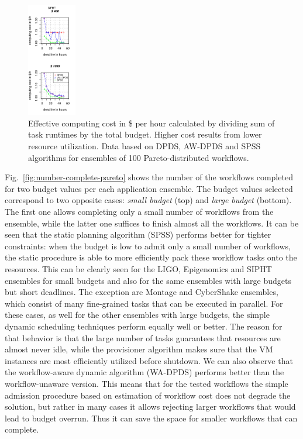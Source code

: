 \documentclass{sig-alternate}
\begin{document}
\begin{figure}[htb]
\includegraphics[width=0.19\textwidth]{figures/pareto-cost-SIPHT-n-1000-8-dagh5-50m0.pdf}
\caption{Effective computing cost in \$ per hour calculated by dividing sum of
task runtimes by the total budget. Higher cost results from lower resource utilization. Data based on DPDS, AW-DPDS and SPSS algorithms for ensembles of 100
Pareto-distributed workflows.}
\label{fig:cost}
\end{figure}

Fig.~\ref{fig:number-complete-pareto} shows the number of the workflows
completed for two budget values per each application ensemble. The budget values
selected correspond to two opposite cases: {\em small budget} (top) and {\em
large budget} (bottom). The first one allows completing only a small number of
workflows from the ensemble, while the latter one suffices to finish almost all
the workflows. It can be seen that the static planning algorithm (SPSS) performs
better for tighter constraints: when the budget is low to admit only a small
number of workflows, the static procedure is able to more efficiently pack these
workflow tasks onto the resources. This can be clearly seen for the LIGO,
Epigenomics and SIPHT ensembles for small budgets and also for the same
ensembles with large budgets but short deadlines. The exception are Montage and
CyberShake ensembles, which consist of many fine-grained tasks that can be
executed in parallel. For these cases, as well for the other ensembles with
large budgets, the simple dynamic scheduling techniques perform equally well or
better. The reason for that behavior is that the large number of tasks
guarantees that resources are almost never idle, while the provisioner algorithm
makes sure that the VM instances are most efficiently utilized before shutdown.
We can also observe that the workflow-aware dynamic algorithm (WA-DPDS) performs
better than the workflow-unaware version. This means that for the tested
workflows the simple admission procedure based on estimation of workflow cost
does not degrade the solution, but rather in many cases it allows rejecting
larger workflows that would lead to budget overrun. Thus it can save the space
for smaller workflows that can complete.
\end{document}
